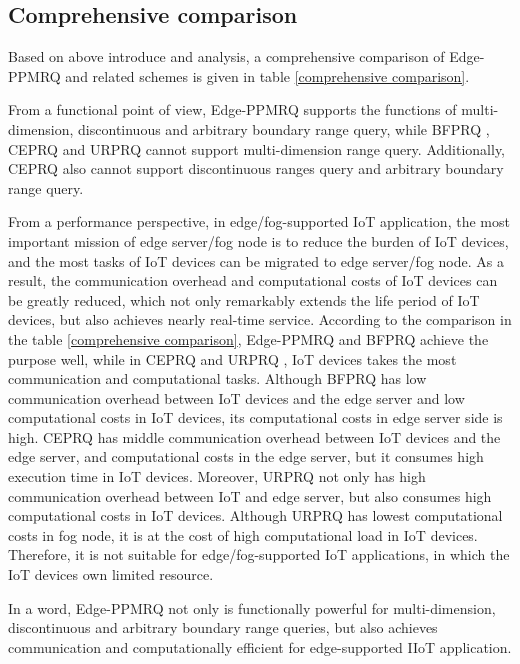 \documentclass[IEEE JOURNAL OF BIOMEDICAL AND HEALTH INFORMATICS]{IEEEtran}
\begin{document}
\subsection{Comprehensive comparison}
Based on above introduce and analysis, a comprehensive comparison of Edge-PPMRQ and related schemes is given in table \ref{comprehensive comparison}.

From a functional point of view, Edge-PPMRQ supports the functions of multi-dimension, discontinuous and arbitrary boundary range query, while BFPRQ \cite{mahdikhani2020IoT}, CEPRQ \cite{hasan2020IoT} and URPRQ  \cite{mahdikhani2020using} cannot support multi-dimension range query. Additionally, CEPRQ \cite{hasan2020IoT} also cannot support discontinuous ranges query and arbitrary boundary range query. 

From a performance perspective, in edge/fog-supported IoT application, the most important mission of edge server/fog node is to reduce the burden of IoT devices, and the most tasks of IoT devices can be migrated to edge server/fog node. As a result, the communication overhead and computational costs of IoT devices can be greatly reduced, which not only remarkably extends the life period of IoT devices, but also achieves nearly real-time service. According to the comparison in the table \ref{comprehensive comparison}, Edge-PPMRQ and BFPRQ \cite{mahdikhani2020IoT} achieve the purpose well, while in CEPRQ \cite{hasan2020IoT} and URPRQ \cite{mahdikhani2020using}, IoT devices takes the most communication and computational tasks. Although BFPRQ \cite{mahdikhani2020IoT} has low communication overhead between IoT devices and the edge server and low computational costs in IoT devices, its computational costs in edge server side is high. CEPRQ \cite{hasan2020IoT} has middle communication overhead between IoT devices and the edge server, and computational costs in the edge server, but it consumes high execution time in IoT devices. Moreover, URPRQ \cite{mahdikhani2020using} not only has high communication overhead between IoT and edge server, but also consumes high computational costs in IoT devices. Although URPRQ \cite{mahdikhani2020using} has lowest computational costs in fog node, it is at the cost of high computational load in IoT devices. Therefore, it is not suitable for edge/fog-supported IoT applications, in which the IoT devices own limited resource. 

In a word, Edge-PPMRQ not only is functionally powerful for multi-dimension, discontinuous and arbitrary boundary range queries, but also achieves communication and computationally efficient for edge-supported IIoT application.
\end{document}
